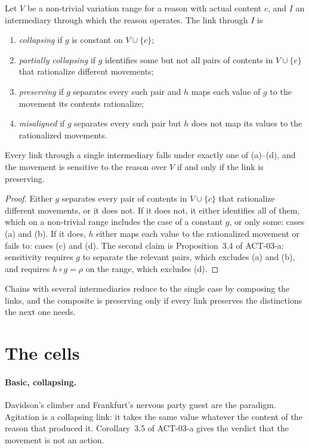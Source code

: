 \documentclass{situationist-preprint}
\begin{document}
\begin{definition}\label{d:kinds}
Let $V$ be a non-trivial variation range for a reason with actual content $c$, and $I$ an intermediary through which the reason operates. The link through $I$ is
\begin{enumerate}
\item[(a)] \emph{collapsing} if $g$ is constant on $V \cup \{c\}$;
\item[(b)] \emph{partially collapsing} if $g$ identifies some but not all pairs of contents in $V \cup \{c\}$ that rationalize different movements;
\item[(c)] \emph{preserving} if $g$ separates every such pair and $h$ maps each value of $g$ to the movement its contents rationalize;
\item[(d)] \emph{misaligned} if $g$ separates every such pair but $h$ does not map its values to the rationalized movements.
\end{enumerate}
\end{definition}

\begin{proposition}\label{p:exhaust}
Every link through a single intermediary falls under exactly one of (a)--(d), and the movement is sensitive to the reason over $V$ if and only if the link is preserving.
\end{proposition}

\begin{proof}
Either $g$ separates every pair of contents in $V \cup \{c\}$ that rationalize different movements, or it does not. If it does not, it either identifies all of them, which on a non-trivial range includes the case of a constant $g$, or only some: cases (a) and (b). If it does, $h$ either maps each value to the rationalized movement or fails to: cases (c) and (d). The second claim is Proposition~3.4 of ACT-03-a: sensitivity requires $g$ to separate the relevant pairs, which excludes (a) and (b), and requires $h \circ g = \rho$ on the range, which excludes (d).
\end{proof}

Chains with several intermediaries reduce to the single case by composing the links, and the composite is preserving only if every link preserves the distinctions the next one needs.

\section{The cells}

\paragraph{Basic, collapsing.} Davidson's climber and Frankfurt's nervous party guest \citep{Frankfurt1978} are the paradigm. Agitation is a collapsing link: it takes the same value whatever the content of the reason that produced it. Corollary~3.5 of ACT-03-a gives the verdict that the movement is not an action.
\end{document}
